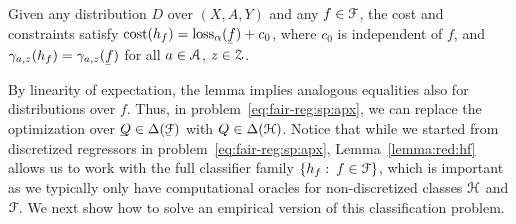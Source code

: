 \documentclass{article}
\begin{document}
\begin{lemma}
\label{lemma:red:hf}
Given any distribution $D$ over $(X,A,Y)$ and any $f \in \mathcal{F}$, the cost and constraints  satisfy $\cost(h_f)=\loss_\alpha(\underf)+c_0$, where $c_0$ is independent of $f$, and $\gamma_{a,z}(h_f)=\gamma_{a,z}(\underf)$ for all $a\in\mathcal{A}$, $z\in\mathcal{Z}$.
\end{lemma}



%
By linearity of expectation, the lemma implies analogous equalities also for distributions over $f$. Thus, in problem~\eqref{eq:fair-reg:sp:apx}, we can replace the optimization over $\underQ\in\Delta(\underF)$ with $Q \in\Delta(\mathcal{H})$. %
%
Notice that while we started from discretized regressors in problem~\eqref{eq:fair-reg:sp:apx}, Lemma~\ref{lemma:red:hf} allows us to work with the full classifier family $\{h_f:\:f \in \mathcal{F}\}$, which is important as we typically only have computational oracles for non-discretized classes $\mathcal{H}$ and $\mathcal{F}$.
We next show how to solve an empirical version of this classification problem.
\end{document}
